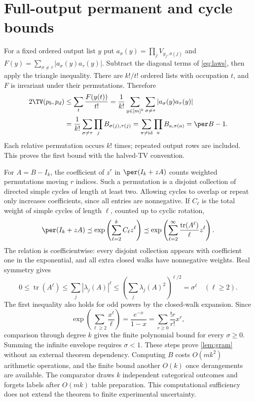\section{Full-output permanent and cycle bounds}\label{app:gram}
For a fixed ordered output list $y$ put $a_\sigma(y)=\prod_jV_{y_j,\sigma(j)}$ and $F(y)=\sum_{\sigma\ne\tau}|a_\sigma(y)a_\tau(y)|$. Subtract the diagonal terms of \cref{eq:laws}, then apply the triangle inequality. There are $k!/t!$ ordered lists with occupation $t$, and $F$ is invariant under their permutations. Therefore
\begin{align}
 2\TV(p_b,p_d)&\le\sum_t\frac{F(y(t))}{t!}
 =\frac1{k!}\sum_{y\in[m]^k}\sum_{\sigma\ne\tau}|a_\sigma(y)a_\tau(y)|\nonumber\\
 &=\frac1{k!}\sum_{\sigma\ne\tau}\prod_j B_{\sigma(j),\tau(j)}
 =\sum_{\pi\ne\mathrm{id}}\prod_a B_{a,\pi(a)}=\per B-1.
\end{align}
Each relative permutation occurs $k!$ times; repeated output rows are included. This proves the first bound with the halved-TV convention.

For $A=B-I_k$, the coefficient of $z^r$ in $\per(I_k+zA)$ counts weighted permutations moving $r$ indices. Such a permutation is a disjoint collection of directed simple cycles of length at least two. Allowing cycles to overlap or repeat only increases coefficients, since all entries are nonnegative. If $C_\ell$ is the total weight of simple cycles of length $\ell$, counted up to cyclic rotation,
\begin{equation}
 \per(I_k+zA)\preceq\exp\left(\sum_{\ell=2}^k C_\ell z^\ell\right)
 \preceq\exp\left(\sum_{\ell=2}^\infty\frac{\operatorname{tr}(A^\ell)}\ell z^\ell\right).
\end{equation}
The relation is coefficientwise: every disjoint collection appears with coefficient one in the exponential, and all extra closed walks have nonnegative weights. Real symmetry gives
\begin{equation}
 0\le\operatorname{tr}(A^\ell)\le\sum_j|\lambda_j(A)|^\ell
 \le\left(\sum_j\lambda_j(A)^2\right)^{\ell/2}=\sigma^\ell\quad(\ell\ge2).
\end{equation}
The first inequality also holds for odd powers by the closed-walk expansion. Since
\begin{equation}
 \exp\left(\sum_{\ell\ge2}\frac{x^\ell}{\ell}\right)
 =\frac{e^{-x}}{1-x}=\sum_{r\ge0}\frac{!r}{r!}x^r,
\end{equation}
comparison through degree $k$ gives the finite polynomial bound for every $\sigma\ge0$. Summing the infinite envelope requires $\sigma<1$. These steps prove \cref{lem:gram} without an external theorem dependency. Computing $B$ costs $O(mk^2)$ arithmetic operations, and the finite bound another $O(k)$ once derangements are available. The comparator draws $k$ independent categorical outcomes and forgets labels after $O(mk)$ table preparation. This computational sufficiency does not extend the theorem to finite experimental uncertainty.

